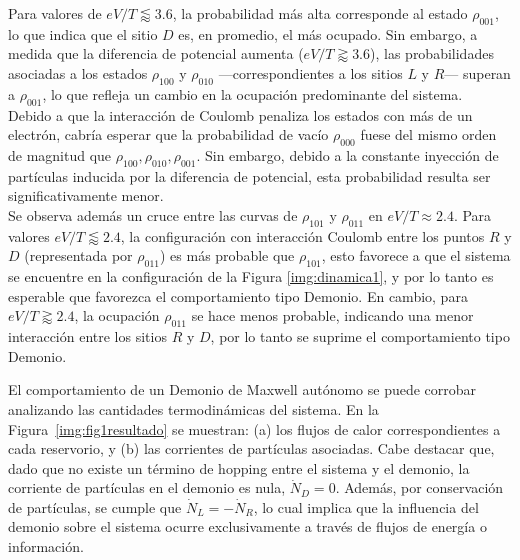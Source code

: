 Para valores de $eV/T \lessapprox 3.6$, la probabilidad más alta corresponde al estado $\rho_{001}$, lo que indica que el sitio $D$ es, en promedio, el más ocupado. Sin embargo, a medida que la diferencia de potencial aumenta ($eV/T \gtrapprox 3.6$), las probabilidades asociadas a los estados $\rho_{100}$ y $\rho_{010}$ —correspondientes a los sitios $L$ y $R$— superan a $\rho_{001}$, lo que refleja un cambio en la ocupación predominante del sistema.
\\

Debido a que la interacción de Coulomb penaliza los estados con más de un electrón, cabría esperar que la probabilidad de vacío $\rho_{000}$ fuese del mismo orden de magnitud que $\rho_{100},\rho_{010},\rho_{001}$. Sin embargo, debido a la constante inyección de partículas inducida por la diferencia de potencial, esta probabilidad resulta ser significativamente menor. 
\\

Se observa además un cruce entre las curvas de $\rho_{101}$ y $\rho_{011}$ en $eV/T \approx 2.4$. Para valores $eV/T \lessapprox 2.4$, la configuración con interacción Coulomb entre los puntos $R$ y $D$ (representada por $\rho_{011}$) es más probable que $\rho_{101}$, esto favorece a que el sistema se encuentre en la configuración de la Figura \ref{img:dinamica1}, y por lo tanto es esperable que favorezca el comportamiento tipo Demonio. En cambio, para $eV/T \gtrapprox 2.4$, la ocupación $\rho_{011}$ se hace menos probable, indicando una menor interacción entre los sitios $R$ y $D$, por lo tanto se suprime el comportamiento tipo Demonio.



El comportamiento de un Demonio de Maxwell autónomo se puede corrobar analizando las cantidades termodinámicas del sistema. En la Figura~\ref{img:fig1resultado} se muestran: (a) los flujos de calor correspondientes a cada reservorio, y (b) las corrientes de partículas asociadas. Cabe destacar que, dado que no existe un término de hopping entre el sistema y el demonio, la corriente de partículas en el demonio es nula, $\dot{N}_{D} = 0$. Además, por conservación de partículas, se cumple que $\dot{N}_{L} = -\dot{N}_{R}$, lo cual implica que la influencia del demonio sobre el sistema ocurre exclusivamente a través de flujos de energía o información.
\\

